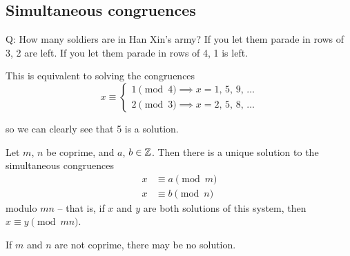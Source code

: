 \documentclass{../template/note}
\begin{document}
    \subsection{Simultaneous congruences}

    Q: How many soldiers are in Han Xin's army? If you let them parade in rows of 3, 2 are left. If you let them parade in rows of 4, 1 is left.

    This is equivalent to solving the congruences
    \[
        x \equiv \begin{cases}
            1 \pmod 4 \implies x = 1, \, 5, \, 9, \, \dots\\
            2 \pmod 3\implies x = 2, \, 5, \, 8, \, \dots
        \end{cases}
    \]
    
    so we can clearly see that 5 is a solution.

    \begin{theorem}
        Let \(m\), \(n\) be coprime, and \(a\), \(b \in \mathbb Z\). Then there is a unique solution to the simultaneous congruences
        \begin{align*}
            x &\equiv a \pmod m \\
            x &\equiv b \pmod n
        \end{align*}
        modulo \(mn\) -- that is, if \(x\) and \(y\) are both solutions of this system, then \(x \equiv y \pmod{mn}\).
        \label{chinese-remainder-theorem}
    \end{theorem}
    
    \begin{remark*}
        If \(m\) and \(n\) are not coprime, there may be no solution.
    \end{remark*}
    
\end{document}
